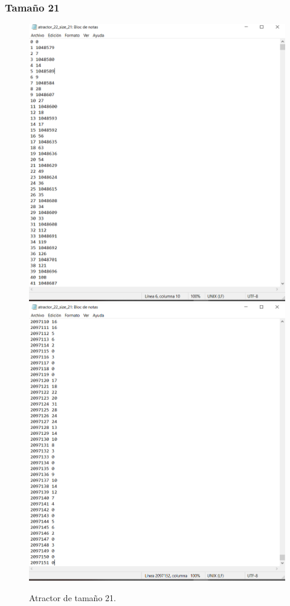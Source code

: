 \documentclass[11pt]{article}
\begin{document}
			\subsubsection{Tamaño 21}
			\begin{figure}[H]
			\centering
			\includegraphics[scale=0.3]{resources/Atractores22/atractor_22_size_21.png}
			\includegraphics[scale=0.3]{resources/Atractores22/atractor_22_size_211.png}
			\caption{Atractor de tamaño 21.}\label{fig:picture}
			\end{figure}
\end{document}
